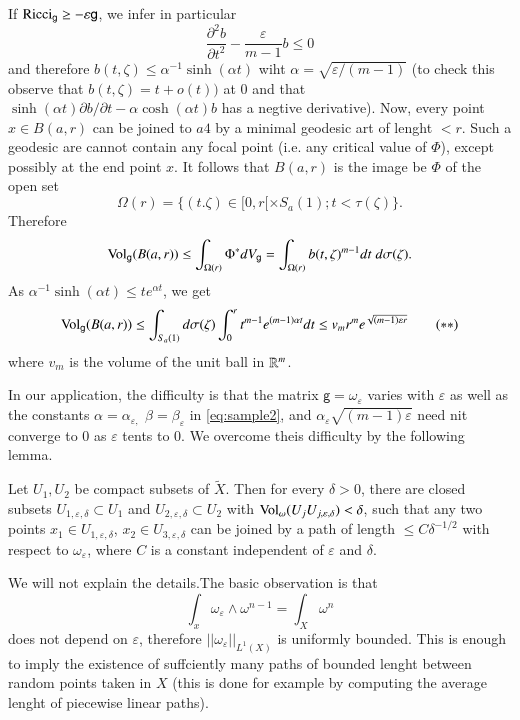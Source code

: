 If $\operatorname{Ricci}_{\mathsf{g}} \geq -\varepsilon\mathsf{g}$, we infer in particular
$$
\dfrac{\partial^{2}b}{\partial t^{2}} - \dfrac{\varepsilon}{m-1} b\leq 0
$$
and therefore $b(t, \zeta) \leq \alpha^{-1} \sinh(\alpha t)$ wiht $\alpha = \sqrt{\varepsilon/(m-1)}$ (to check this observe that $b(t, \zeta) = t + o(t))$ at 0 and that $\sinh(\alpha t)\partial b/\partial t -\alpha \cosh(\alpha t)b$ has a negtive derivative). Now, every point $x\in B(a, r)$ can be joined to $a4$ by a minimal geodesic art of lenght $< r$. Such a geodesic are cannot contain any focal point (i.e. any critical value of $\Phi$), except possibly at the end point $x$. It follows that $B(a, r)$ is the image be $\Phi$ of the open set
$$
\Omega(r) = \{(t. \zeta) \in [0, r[ \times S_{a}(1); t<\tau (\zeta)\}.
$$
Therefore
$$
\operatorname{Vol}_{\mathsf{g}}(B(a, r)) \leq \int_{\Omega(r)} \Phi^{*}dV_{\mathsf{g}} = \int_{\Omega(r)}b(t, \zeta)^{m-1}dt\; d\sigma(\zeta).
$$
As $\alpha^{-1}\sinh(\alpha t)\leq t e^{\alpha t}$, we get
\begin{equation*}
\operatorname{Vol}_{\mathsf{g}}(B(a, r)) \leq \int_{S_{a}(1)} d\sigma(\zeta) \int_{0}^{r} t^{m-1}e^{(m-1) \alpha t} dt\leq v_{m}r^{m}
e^{\sqrt{(m-1)\varepsilon r}} \tag{$\ast\ast$}\label{eq:sample3}
\end{equation*}
where $v_{m}$ is the volume of the unit ball in $\mathbb{R}^{m}$.

In our application, the difficulty is that the matrix $\mathsf{g} = \omega_{\varepsilon}$ varies with $\varepsilon$ as well as the constants $\alpha = \alpha_{\varepsilon,}$  $\beta = \beta_{\varepsilon}$ in \eqref{eq:sample2}, and $\alpha_{\varepsilon}\sqrt{(m-1)\varepsilon}$ need nit converge to 0 as $\varepsilon$ tents to 0. We overcome theis difficulty by the following lemma.

\begin{lem}\label{art5-lemma-2.8}
Let $U_{1}, U_{2}$ be compact subsets of $\widetilde{X}$. Then for every $\delta > 0$, there are closed subsets $U_{1, \varepsilon,\delta} \subset U_{1}$ and $U_{2, \varepsilon, \delta} \subset U_{2}$ with $\operatorname{Vol}_{\omega}(U_{j}U_{j, \varepsilon, \delta}) < \delta$, such that any two points $x_{1}\in U_{1, \varepsilon, \delta}$, $x_{2} \in U_{3, \varepsilon, \delta}$ can be joined by a path of length $\leq C \delta^{-1/2}$ with respect to $\omega_{\varepsilon}$, where $C$ is a  constant independent of $\varepsilon$ and $\delta$. 
\end{lem}

We will not explain the details.The basic observation is that
$$
\int_{x}\omega_{\varepsilon} \wedge \omega^{n-1} = \int_{X} \omega^{n}
$$
does not depend on $\varepsilon$, therefore $||\omega_{\varepsilon}||_{L^{1} (X)}$ is uniformly bounded. This is enough to imply the existence of suffciently many paths of bounded lenght between random points taken in $X$ (this is done for example by computing the average lenght of piecewise linear paths).

